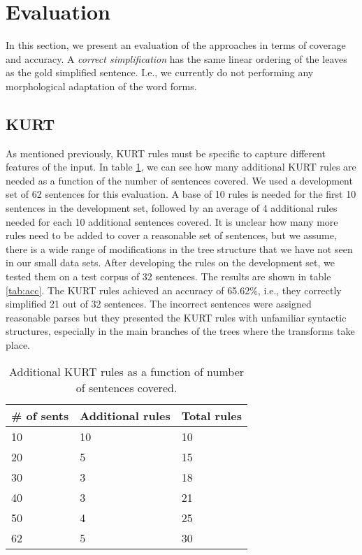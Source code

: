 \documentclass[a4paper,11pt]{article}
\begin{document}

\section{Evaluation}

In this section, we present an evaluation of the approaches in terms of coverage and accuracy. A \textit{correct simplification} has the same linear ordering of the leaves as the gold simplified sentence. I.e., we currently do not performing any morphological adaptation of the word forms.
 
\subsection{KURT}

As mentioned previously, KURT rules must be specific to capture different features of the input. In table \ref{tab:kurtcoverage}, we can see how many additional KURT rules are needed as a function of the number of sentences covered. We used a development set of 62 sentences for this evaluation. A base of 10 rules is needed for the first 10 sentences in the development set, followed by an average of 4 additional rules needed for each 10 additional sentences covered. It is unclear how many more rules need to be added to cover a reasonable set of sentences, but we assume, there is a wide range of modifications in the tree structure that we have not seen in our small data sets.  After developing the rules on the development set, we tested them on a test corpus of 32 sentences.  The results are shown in table \ref{tab:acc}. The KURT rules achieved an accuracy of 65.62\%, i.e., they correctly simplified 21 out of 32 sentences. The incorrect sentences were assigned reasonable parses but they presented the KURT rules with unfamiliar syntactic structures, especially in the main branches of the trees where the transforms take place.

\begin{table}
	\centering
		\begin{tabular}{l|ll}
		\# of sents & Additional rules & Total rules\\
		\hline
			10  &  10 & 10 \\
			20 & 5  & 15 \\
			30 & 3 & 18 \\
			40 & 3 & 21 \\
			50 & 4 & 25 \\
			62 & 5 & 30 \\ \hline
		\end{tabular}
	\caption{Additional KURT rules as a function of number of sentences covered.}
	\label{tab:kurtcoverage}
\end{table}
\end{document}
